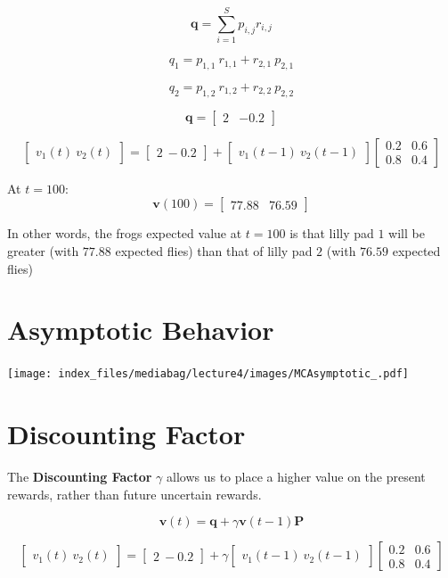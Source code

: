 \documentclass[
  letterpaper,
  DIV=11,
  numbers=noendperiod]{scrreprt}
\begin{document}
\[
\mathbf{q} = \sum_{i=1}^{S} p_{i,j} r_{i,j}
\]

\[
q_{1} = p_{1,1} \ r_{1,1} + r_{2,1} \ p_{2,1}
\]

\[
q_{2} = p_{1,2} \ r_{1,2} + r_{2,2} \ p_{2,2}
\]

\[
\textbf{q} = 
\begin{bmatrix}
    2 & -0.2
\end{bmatrix}
\]

\[
\begin{bmatrix} v_{1}(t) \ v_{2}(t) \end{bmatrix} = \begin{bmatrix} 2 \ -0.2 \end{bmatrix} + \begin{bmatrix} v_{1}(t-1) \ v_{2}(t-1) \end{bmatrix} \begin{bmatrix} 0.2 & 0.6 \\ 0.8 & 0.4 \end{bmatrix}
\]

At \(t=100\): \[
\mathbf{v}(100) = \begin{bmatrix} 77.88 & 76.59 \end{bmatrix}
\]

In other words, the frogs expected value at \(t = 100\) is that lilly
pad \(1\) will be greater (with \(77.88\) expected flies) than that of
lilly pad \(2\) (with \(76.59\) expected flies)

\section{Asymptotic Behavior}\label{asymptotic-behavior}

\texttt{[image: index\_files/mediabag/lecture4/images/MCAsymptotic\_.pdf]}

\section{Discounting Factor}\label{discounting-factor}

\item

The \textbf{Discounting Factor} \(\gamma\) allows us to place a higher
value on the present rewards, rather than future uncertain rewards.

\[
\mathbf{v}(t) = \mathbf{q} + \gamma \mathbf{v}(t-1) \mathbf{P}
\]

\[
\begin{bmatrix} v_{1}(t) \ v_{2}(t) \end{bmatrix} = \begin{bmatrix} 2 \ -0.2 \end{bmatrix} + \gamma \begin{bmatrix} v_{1}(t-1) \ v_{2}(t-1) \end{bmatrix} \begin{bmatrix} 0.2 & 0.6 \\ 0.8 & 0.4 \end{bmatrix}
\]
\end{document}
